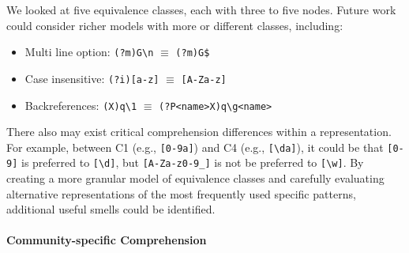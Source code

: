 We looked at five equivalence classes, each with three to five nodes.
Future work could consider richer models with more or different classes, including: 
%
\begin{itemize} %
\item Multi line option: { \verb!(?m)G\n! $\equiv$ \verb!(?m)G$!}
\item Case insensitive:{ \verb!(?i)[a-z]! $\equiv$ \verb![A-Za-z]!}
\item Backreferences: {\verb!(X)q\1! $\equiv$ \verb!(?P<name>X)q\g<name>!}
\end{itemize}



There also may exist critical comprehension differences within a representation. For example, between C1 (e.g., \verb![0-9a]!) and C4 (e.g., \verb![\da]!), it could be that \verb![0-9]! is preferred to \verb![\d]!, but \verb![A-Za-z0-9_]! is not be preferred to \verb![\w]!.
By creating a more granular model of equivalence classes  and carefully evaluating alternative representations of the most frequently used specific patterns,  additional useful smells could be identified.



\paragraph{Community-specific Comprehension}

